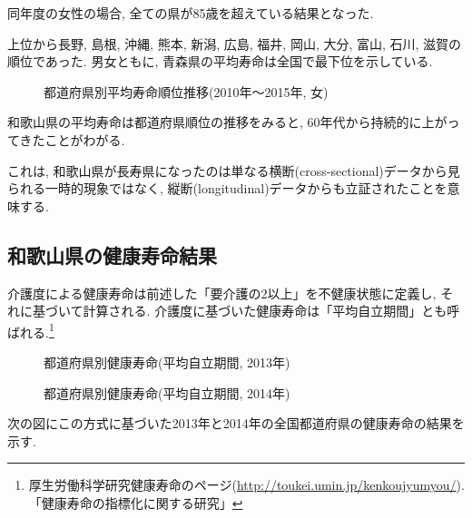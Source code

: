 
同年度の女性の場合, 全ての県が85歳を超えている結果となった.

上位から長野, 島根, 沖縄, 熊本, 新潟, 広島, 福井, 岡山, 大分, 富山, 石川, 滋賀の順位であった.
男女ともに, 青森県の平均寿命は全国で最下位を示している.
\begin{figure}[h!]
	\begin{center}
		\caption{都道府県別平均寿命順位推移(2010年〜2015年, 女)}\end{center}
\end{figure}






和歌山県の平均寿命は都道府県順位の推移をみると,
60年代から持続的に上がってきたことがわがる.

これは, 和歌山県が長寿県になったのは単なる横断(cross-sectional)データから見られる一時的現象ではなく, 縦断(longitudinal)データからも立証されたことを意味する.


\subsection{和歌山県の健康寿命結果}
介護度による健康寿命は前述した「要介護の2以上」を不健康状態に定義し, それに基づいて計算される. 介護度に基づいた健康寿命は「平均自立期間」とも呼ばれる.\footnote{厚生労働科学研究健康寿命のページ(\url{http://toukei.umin.jp/kenkoujyumyou/}).
	「健康寿命の指標化に関する研究」
}
\begin{figure}[h!]
	\begin{center}
		\caption{都道府県別健康寿命(平均自立期間, 2013年)}\label{fig1}
	\end{center}
\end{figure}
\begin{figure}[h!]
	\begin{center}
		\caption{都道府県別健康寿命(平均自立期間, 2014年)}\label{fig1}
	\end{center}
\end{figure}
次の図にこの方式に基づいた2013年と2014年の全国都道府県の健康寿命の結果を示す.


